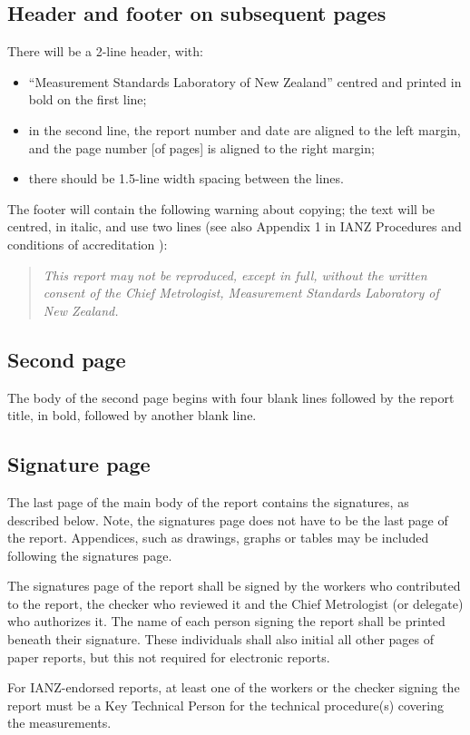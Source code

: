 \subsection{Header and footer on subsequent pages}
There will be a 2-line header, with: 
\begin{itemize}
\item	``Measurement Standards Laboratory of New Zealand'' centred and printed in bold on the first line; 
\item	in the second line, the report number and date are aligned to the left margin, and the page number [of pages] is aligned to the right margin;
\item	there should be 1.5-line width spacing between the lines.
\end{itemize}
The footer will contain the following warning about copying; the text will be centred, in italic, and use two lines (see also Appendix 1 in IANZ Procedures and conditions of accreditation \cite{IANZ_PC}): 
\begin{quote}
\centering\textit{This report may not be reproduced, except in full, without the written consent of the Chief Metrologist, Measurement Standards Laboratory of New Zealand.}
\end{quote}

\subsection{Second page}
The body of the second page begins with four blank lines followed by the report title, in bold, followed by another blank line.

\subsection{Signature page}
The last page of the main body of the report contains the signatures, as described below. Note, the signatures page does not have to be the last page of the report. Appendices, such as drawings, graphs or tables may be included following the signatures page.

The signatures page of the report shall be signed by the workers who contributed to the report, the checker who reviewed it and the Chief Metrologist (or delegate) who authorizes it. The name of each person signing the report shall be printed beneath their signature. These individuals shall also initial all other pages of paper reports, but this not required for electronic reports.

For IANZ-endorsed reports, at least one of the workers or the checker signing the report must be a Key Technical Person for the technical procedure(s)  covering the measurements.


